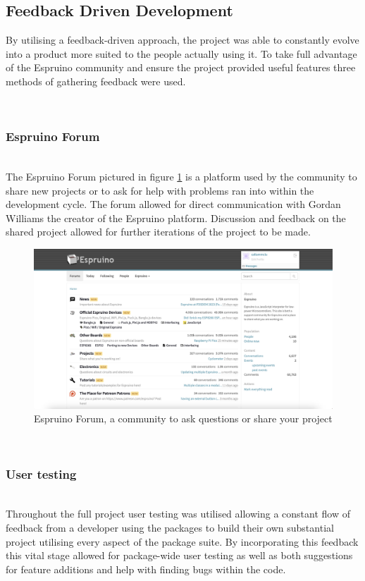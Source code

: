 \documentclass{l4proj}
\begin{document}
\subsection{Feedback Driven Development}
By utilising a feedback-driven approach, the project was able to constantly evolve into a product more suited to the people actually using it. To take full advantage of the Espruino community and ensure the project provided useful features three methods of gathering feedback were used.

\text \\

\subsubsection{Espruino Forum}\hfill\\
The Espruino Forum pictured in figure \ref{fig:espruino-forum} is a platform used by the community to share new projects or to ask for help with problems ran into within the development cycle. The forum allowed for direct communication with Gordan Williams the creator of the Espruino platform. Discussion and feedback on the shared project allowed for further iterations of the project to be made.

\begin{figure}[!ht]
    \centering
    \includegraphics[width=12cm]{dissertation/images/espruino-forum.png}
    \caption{Espruino Forum, a community to ask questions or share your project}
    \label{fig:espruino-forum}
\end{figure}

\text \\
\subsubsection{User testing}\hfill\\
Throughout the full project user testing was utilised allowing a constant flow of feedback from a developer using the packages to build their own substantial project utilising every aspect of the package suite. By incorporating this feedback this vital stage allowed for package-wide user testing as well as both suggestions for feature additions and help with finding bugs within the code.
\end{document}
